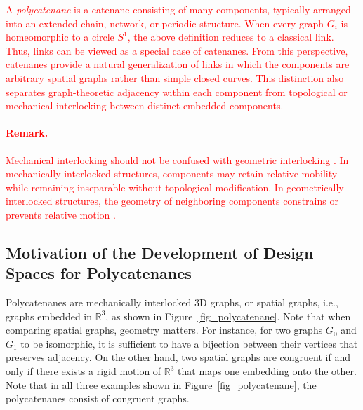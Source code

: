 \documentclass[times,twocolumn,final]{elsarticle}
\begin{document}
\textcolor{red}{A \emph{polycatenane} is a catenane consisting of many components, typically arranged into an extended chain, network, or periodic structure. When every graph $G_i$ is homeomorphic to a circle $S^1$, the above definition reduces to a classical link. Thus, links can be viewed as a special case of catenanes. From this perspective, catenanes provide a natural generalization of links in which the components are arbitrary spatial graphs rather than simple closed curves. This distinction also separates graph-theoretic adjacency within each component from topological or mechanical interlocking between distinct embedded components.}

\textcolor{red}{\paragraph{Remark.}
Mechanical interlocking should not be confused with geometric interlocking \cite{estrin2021design}. In mechanically interlocked structures, components may retain relative mobility while remaining inseparable without topological modification. In geometrically interlocked structures, the geometry of neighboring components constrains or prevents relative motion \cite{estrin2021design}.} 

\subsection{Motivation of the Development of Design Spaces for Polycatenanes}

Polycatenanes are mechanically interlocked 3D graphs, or spatial graphs, i.e., graphs embedded in $\mathbb{R}^3$, as shown in Figure~\ref{fig_polycatenane}. 
Note that when comparing spatial graphs, geometry matters. For instance, for two graphs $G_0$ and $G_1$ to be isomorphic, it is sufficient to have a bijection between their vertices that preserves adjacency. On the other hand, two spatial graphs are congruent if and only if there exists a rigid motion of $\mathbb{R}^3$ that maps one embedding onto the other. Note that in all three examples shown in Figure~\ref{fig_polycatenane}, the polycatenanes consist of congruent graphs.
\end{document}
